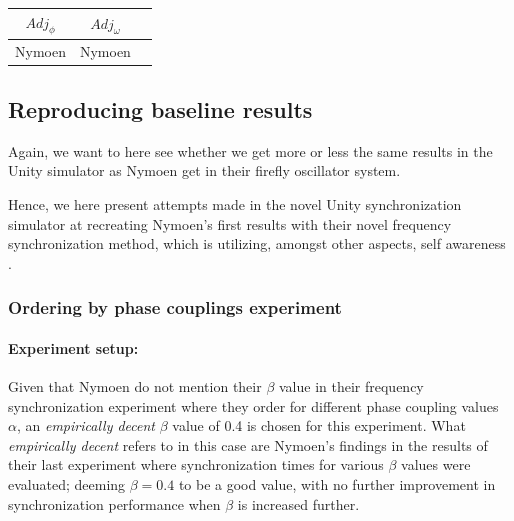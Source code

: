 \begin{center}
\begin{tabular}{ |c|c|c| } 
\hline
$Adj_\phi$ & $Adj_\omega$ \\
\hline
Nymoen & Nymoen  \\
\hline
\end{tabular}
\label{tab:phase_and_freq_sync}
\end{center}


	
	
	
	

	\subsection{Reproducing baseline results}
	Again, we want to here see whether we get more or less the same results in the Unity simulator as Nymoen get in their firefly oscillator system.
	
	Hence, we here present attempts made in the novel Unity synchronization simulator at recreating Nymoen's first results with their novel frequency synchronization method, which is utilizing, amongst other aspects, self awareness \cite{nymoen_synch}.
	
		\subsubsection{Ordering by phase couplings experiment}
		\label{exp:phase_and_freq_baseline_reproducing_initial_phase_ordering}
		
			\paragraph{Experiment setup:\nl}
			
			Given that Nymoen do not mention their $\beta$ value in their frequency synchronization experiment where they order for different phase coupling values $\alpha$, an \textit{empirically decent} $\beta$ value of 0.4 is chosen for this experiment. What \textit{empirically decent} refers to in this case are Nymoen's findings in the results of their last experiment \cite{nymoen_synch} where synchronization times for various $\beta$ values were evaluated; deeming $\beta=0.4$ to be a good value, with no further improvement in synchronization performance when $\beta$ is increased further.
			
